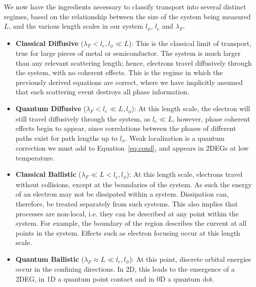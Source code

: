We now have the ingredients necessary to classify transport into several distinct regimes, based on the relationship between the size
of the system being measured $L$, and the various length scales in our system $l_\phi$, $l_e$ and $\lambda_F$.
\begin{itemize}
  \item \textbf{Classical Diffusive} ($\lambda_F < l_e, l_\phi \ll L$): This is the classical limit of transport, true for large pieces of metal or semiconductor. The system is much larger than any relevant scattering length; hence, electrons travel diffusively through the system, with no coherent effects. This is the regime in which the previously derived equations are correct, where we have implicitly assumed that each scattering event destroys all phase information.
  \item \textbf{Quantum Diffusive} ($\lambda_F < l_e \ll L, l_\phi$): At this length scale, the electron will still travel diffusively through the system, as $l_e \ll L$, however, phase coherent effects begin to appear, since correlations between the phases of different paths exist for path lengths up to $l_\phi$. Weak localization is a quantum correction we must add to Equation~\ref{eq:cond}, and appears in 2DEGs at low temperature.
  \item \textbf{Classical Ballistic} ($\lambda_F \ll L < l_e, l_\phi$): At this length scale, electrons travel without collisions, except at the boundaries of the system. As such the energy of an electron may not be dissipated within a system. Dissipation can, therefore, be treated separately from such systems. This also implies that processes are non-local, i.e. they can be described at any point within the system. For example, the boundary of the region describes the current at all points in the system. Effects such as electron focusing occur at this length scale.
  \item \textbf{Quantum Ballistic} ($\lambda_F \approx L \ll l_e, l_\phi$): At this point, discrete orbital energies occur in the confining directions. In 2D, this leads to the emergence of a 2DEG, in 1D a quantum point contact and in 0D a quantum dot.
\end{itemize}


